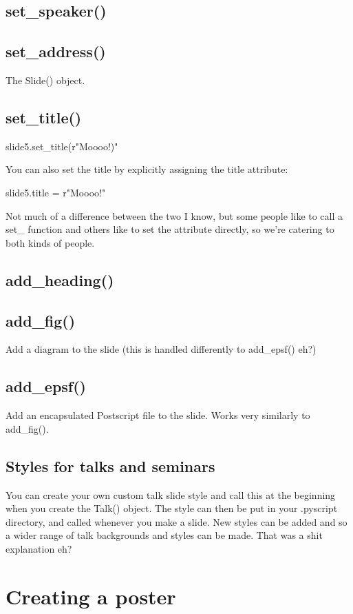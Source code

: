 \subsection{set\_speaker()}

\subsection{set\_address()}


The Slide() object.

\subsection{set\_title()}

\begin{python}
slide5.set_title(r"Moooo!)"
\end{python}

You can also set the title by explicitly assigning the title attribute:
\begin{python}
slide5.title = r"Moooo!"
\end{python}

Not much of a difference between the two I know, but some people like to
call a set\_ function and others like to set the attribute directly, so
we're catering to both kinds of people.

\subsection{add\_heading()}

\subsection{add\_fig()}

Add a diagram to the slide (this is handled differently to add\_epsf() eh?)

\subsection{add\_epsf()}

Add an encapsulated Postscript file to the slide.  Works very similarly to
add\_fig().

\subsection{Styles for talks and seminars}

You can create your own custom talk slide style and call this at the
beginning when you create the Talk() object.  The style can then be put in
your .pyscript directory, and called whenever you make a slide.  New styles
can be added and so a wider range of talk backgrounds and styles can be
made.  That was a shit explanation eh?

\section{Creating a poster}

